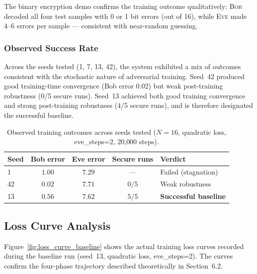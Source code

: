 \documentclass[12pt, a4paper]{article}
\newcommand{\bob}{\textsc{Bob}}
\newcommand{\eve}{\textsc{Eve}}
\begin{document}
The binary encryption demo confirms the training outcome qualitatively:
\bob{} decoded all four test samples with 0 or 1 bit errors (out of 16),
while \eve{} made 4--6 errors per sample --- consistent with near-random
guessing.

\subsubsection*{Observed Success Rate}

Across the seeds tested (1, 7, 13, 42), the system exhibited a mix of
outcomes consistent with the stochastic nature of adversarial training.
Seed~42 produced good training-time convergence (Bob error 0.02) but
weak post-training robustness (0/5 secure runs). Seed~13 achieved both
good training convergence and strong post-training robustness (4/5 secure
runs), and is therefore designated the successful baseline.

\begin{table}[H]
  \centering
  \caption{Observed training outcomes across seeds tested
           ($N=16$, quadratic loss, eve\_steps=2, 20{,}000 steps).}
  \label{tab:baseline_outcomes}
  \renewcommand{\arraystretch}{1.35}
  \begin{tabularx}{\linewidth}{@{} l c c c X @{}}
    \toprule
    \textbf{Seed} & \textbf{Bob error} & \textbf{Eve error} &
    \textbf{Secure runs} & \textbf{Verdict} \\
    \midrule
    1  & $1.00$ & $7.29$ & ---   & Failed (stagnation) \\
    42 & $0.02$ & $7.71$ & $0/5$ & Weak robustness \\
    13 & $0.56$ & $7.62$ & $5/5$ & \textbf{Successful baseline} \\
    \bottomrule
  \end{tabularx}
\end{table}

\subsection{Loss Curve Analysis}
\label{subsec:loss_curves}

Figure~\ref{fig:loss_curve_baseline} shows the actual training loss
curves recorded during the baseline run (seed~13, quadratic loss,
eve\_steps=2). The curves confirm the four-phase trajectory described
theoretically in Section~6.2.
\end{document}
